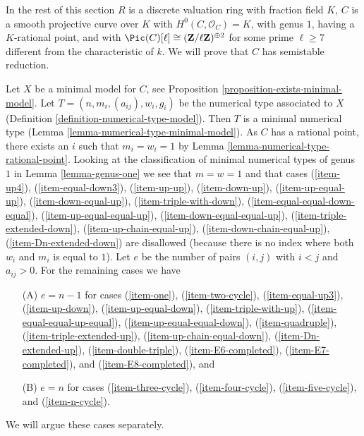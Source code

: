 \medskip\noindent
In the rest of this section
$R$ is a discrete valuation ring with fraction field $K$,
$C$ is a smooth projective curve over $K$ with $H^0(C, \mathcal{O}_C) = K$,
with genus $1$, having a $K$-rational point, and with
$\Pic(C)[\ell] \cong (\mathbf{Z}/\ell \mathbf{Z})^{\oplus 2}$
for some prime $\ell \geq 7$ different from the characteristic of $k$.
We will prove that $C$ has semistable reduction.

\medskip\noindent
Let $X$ be a minimal model for $C$, see
Proposition \ref{proposition-exists-minimal-model}.
Let $T = (n, m_i, (a_{ij}), w_i, g_i)$
be the numerical type associated to $X$
(Definition \ref{definition-numerical-type-model}).
Then $T$ is a minimal numerical type
(Lemma \ref{lemma-numerical-type-minimal-model}).
As $C$ has a rational point, there exists an $i$
such that $m_i = w_i = 1$ by Lemma \ref{lemma-numerical-type-rational-point}.
Looking at the classification of minimal numerical types
of genus $1$ in Lemma \ref{lemma-genus-one}
we see that $m = w = 1$ and that cases
(\ref{item-up4}),
(\ref{item-equal-down3}),
(\ref{item-up-up}),
(\ref{item-down-up}),
(\ref{item-up-equal-up}),
(\ref{item-down-equal-up}),
(\ref{item-triple-with-down}),
(\ref{item-equal-equal-down-equal}),
(\ref{item-up-equal-equal-up}),
(\ref{item-down-equal-equal-up}),
(\ref{item-triple-extended-down}),
(\ref{item-up-chain-equal-up}),
(\ref{item-down-chain-equal-up}),
(\ref{item-Dn-extended-down}) are disallowed (because there is no
index where both $w_i$ and $m_i$ is equal to $1$).
Let $e$ be the number of pairs $(i, j)$ with $i < j$ and
$a_{ij} > 0$. For the remaining cases we have
\begin{enumerate}
\item[(A)] $e = n - 1$ for cases
(\ref{item-one}),
(\ref{item-two-cycle}),
(\ref{item-equal-up3}),
(\ref{item-up-down}),
(\ref{item-up-equal-down}),
(\ref{item-triple-with-up}),
(\ref{item-equal-equal-up-equal}),
(\ref{item-up-equal-equal-down}),
(\ref{item-quadruple}),
(\ref{item-triple-extended-up}),
(\ref{item-up-chain-equal-down}),
(\ref{item-Dn-extended-up}),
(\ref{item-double-triple}),
(\ref{item-E6-completed}),
(\ref{item-E7-completed}), and
(\ref{item-E8-completed}), and
\item[(B)] $e = n$ for cases
(\ref{item-three-cycle}),
(\ref{item-four-cycle}),
(\ref{item-five-cycle}), and
(\ref{item-n-cycle}).
\end{enumerate}
We will argue these cases separately.

